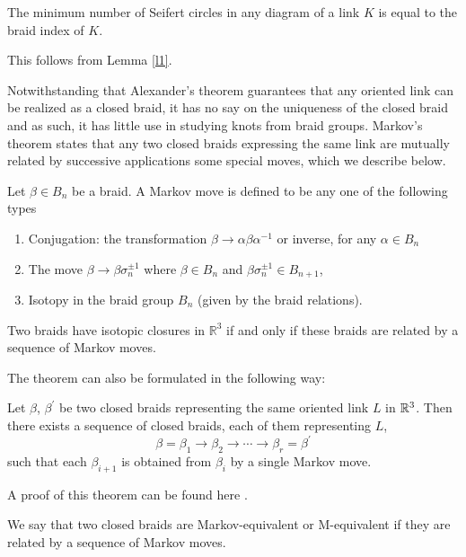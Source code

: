 \begin{corollary}
  The minimum number of Seifert circles in any diagram of a link $K$ is equal to the braid index of $K$.
\end{corollary}

This follows from Lemma \ref{l1}.

Notwithstanding that Alexander's theorem guarantees that any oriented link can be realized as a closed braid, it has no say on the uniqueness of the closed braid and as such, it has little use in studying knots from braid groups. Markov's theorem states that any two closed braids expressing the same link are mutually related by successive applications some special moves, which we describe below.

Let $\beta \in B_n$ be a braid. A Markov move is defined to be any one of the following types
\begin{enumerate}
\item\label{item:6} Conjugation: the transformation $\beta \to \alpha \beta \alpha^{-1}$ or inverse, for any $\alpha \in B_n$
\item\label{item:10} The move $\beta \to \beta \sigma_n^{\pm 1}$ where $\beta \in B_n$ and $\beta \sigma_n^{\pm 1} \in B_{n+1}$,
\item\label{item:12} Isotopy in the braid group $B_n$ (given by the braid relations).
\end{enumerate}
\begin{theorem}[Markov]
    Two braids have isotopic closures in $\mathbb{R}^3$ if and only if these braids are related by a sequence of Markov moves.
  \end{theorem}
  The theorem can also be formulated in the following way:
\begin{theorem}[Markov]
\label{sec:markovs-theorem}
  Let $\beta$, $\beta^{\prime}$ be two closed braids representing the same oriented link $L$ in $\mathbb{R}^3$. Then there exists a sequence of closed braids, each of them representing $L$,
\begin{displaymath}
\beta = \beta_1 \to \beta_2 \to \cdots \to \beta_r = \beta^{\prime}
\end{displaymath}
such that each $\beta_{i+1}$ is obtained from $\beta_i$ by a single Markov move.
\end{theorem}

A proof of this theorem can be found here \cite{traczyk1998new}.

We say that two closed braids are Markov-equivalent or M-equivalent if they are related by a sequence of Markov moves. 

